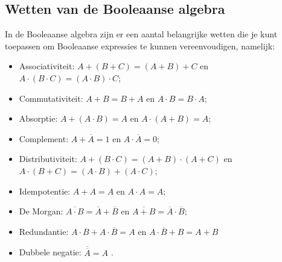 \documentclass[12pt]{article}
\begin{document}
\subsection{Wetten van de Booleaanse algebra}
In de Booleaanse algebra zijn er een aantal belangrijke wetten die je kunt toepassen om Booleaanse expressies te kunnen vereenvoudigen, namelijk:
\begin{itemize}
    \item Associativiteit: $A+(B+C) = (A+B)+C$ en $A\cdot(B\cdot C) = (A\cdot B)\cdot C$; 
    \item Commutativiteit: $A+B = B+A$ en $A\cdot B = B\cdot A$;
    \item Absorptie: $A+(A\cdot B) = A$ en $A \cdot (A+B) = A$;
    \item Complement: $A + \overline{A} = 1$ en $A \cdot \overline{A} = 0$;
    \item Distributiviteit: $A+(B\cdot C) = (A+B)\cdot (A+C)$ en $A \cdot (B+C) = (A\cdot B)+(A\cdot C)$;
    \item Idempotentie: $A + A = A$ en $A \cdot A  = A$;
    \item De Morgan: $\overline{A \cdot B} = \overline{A}+\overline{B}$ en $\overline{A + B} = \overline{A} \cdot \overline{B}$;
    \item Redundantie: $A\cdot B + A\cdot \overline{B} = A$ en $A\cdot \overline{B} + B = A + B$
    \item Dubbele negatie: $\overline{\overline{A}} = A$ \cite{weyt}.
\end{itemize}
\end{document}
